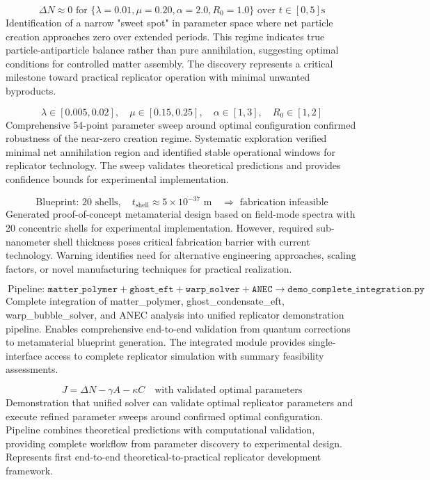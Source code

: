 \documentclass[11pt]{article}
\begin{document}
\[\
\Delta N \approx 0 \text{ for } \{\lambda=0.01, \mu=0.20, \alpha=2.0, R_0=1.0\} \text{ over } t \in [0,5]\text{s}
\]
Identification of a narrow "sweet spot" in parameter space where net particle creation approaches zero over extended periods. This regime indicates true particle-antiparticle balance rather than pure annihilation, suggesting optimal conditions for controlled matter assembly. The discovery represents a critical milestone toward practical replicator operation with minimal unwanted byproducts.

\[\
\lambda \in [0.005, 0.02], \quad \mu \in [0.15, 0.25], \quad \alpha \in [1, 3], \quad R_0 \in [1, 2]
\]
Comprehensive 54-point parameter sweep around optimal configuration confirmed robustness of the near-zero creation regime. Systematic exploration verified minimal net annihilation region and identified stable operational windows for replicator technology. The sweep validates theoretical predictions and provides confidence bounds for experimental implementation.

\[\
\text{Blueprint: } 20\text{ shells}, \quad t_{\text{shell}} \approx 5 \times 10^{-37}\text{ m} \quad \Rightarrow \text{ fabrication infeasible}
\]
Generated proof-of-concept metamaterial design based on field-mode spectra with 20 concentric shells for experimental implementation. However, required sub-nanometer shell thickness poses critical fabrication barrier with current technology. Warning identifies need for alternative engineering approaches, scaling factors, or novel manufacturing techniques for practical realization.

\[\
\text{Pipeline: } \texttt{matter\_polymer} + \texttt{ghost\_eft} + \texttt{warp\_solver} + \texttt{ANEC} \rightarrow \texttt{demo\_complete\_integration.py}
\]
Complete integration of matter_polymer, ghost_condensate_eft, warp_bubble_solver, and ANEC analysis into unified replicator demonstration pipeline. Enables comprehensive end-to-end validation from quantum corrections to metamaterial blueprint generation. The integrated module provides single-interface access to complete replicator simulation with summary feasibility assessments.

\[\
J = \Delta N - \gamma A - \kappa C \quad \text{with validated optimal parameters}
\]
Demonstration that unified solver can validate optimal replicator parameters and execute refined parameter sweeps around confirmed optimal configuration. Pipeline combines theoretical predictions with computational validation, providing complete workflow from parameter discovery to experimental design. Represents first end-to-end theoretical-to-practical replicator development framework.
\end{document}
